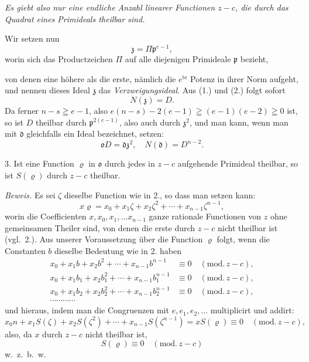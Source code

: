 \documentclass{article}
\begin{document}
\emph{Es giebt also nur eine endliche Anzahl linearer Functionen $z-c$, die durch das Quadrat eines Primideals theilbar sind.}

Wir setzen nun
\[ \mathfrak{z} = \Pi\mathfrak{p}^{e-1}, \tag{2.} \]
worin sich das Productzeichen $\Pi$ auf alle diejenigen Primideale $\mathfrak{p}$ bezieht,

von denen eine höhere als die erste, nämlich die $e^{\text{te}}$ Potenz in ihrer Norm aufgeht, und nennen dieses Ideal $\mathfrak{z}$ das \emph{Verzweigungsideal}. Aus (1.) und (2.) folgt sofort
\[ N(\mathfrak{z}) = D. \tag{3.} \]
Da ferner $n-s \geqq e-1$, also $e(n-s) - 2(e-1) \geqq (e-1)(e-2) \geqq 0$ ist, so ist $D$ theilbar durch $\mathfrak{p}^{2(e-1)}$, also auch durch $\mathfrak{z}^{2}$, und man kann, wenn man mit $\mathfrak{d}$ gleichfalls ein Ideal bezeichnet, setzen:
\[ \mathfrak{o}D = \mathfrak{d}\mathfrak{z}^{2}, \quad N(\mathfrak{d}) = D^{n-2}. \tag{4.} \]

3. Ist eine Function $\varrho$ in $\mathfrak{o}$ durch jedes in $z-c$ aufgehende Primideal theilbar, so ist $S(\varrho)$ durch $z-c$ theilbar.

\emph{Beweis.} Es sei $\zeta$ dieselbe Function wie in 2., so dass man setzen kann:
\[ x\varrho = x_{0} + x_{1}\zeta + x_{2}\zeta^{2} + \cdots + x_{n-1}\zeta^{n-1}, \]
worin die Coefficienten $x, x_{0}, x_{1}, \ldots x_{n-1}$ ganze rationale Functionen von $z$ ohne gemeinsamen Theiler sind, von denen die erste durch $z-c$ nicht theilbar ist (vgl.\ 2.). Aus unserer Voraussetzung über die Function $\varrho$ folgt, wenn die Constanten $b$ dieselbe Bedeutung wie in 2. haben
\[ \begin{aligned} x_{0} + x_{1}b + x_{2}b^{2} + \cdots + x_{n-1}b^{n-1} &\equiv 0 \quad (\text{mod.}\,z-c), \\ x_{0} + x_{1}b_{1} + x_{2}b_{1}^{2} + \cdots + x_{n-1}b_{1}^{n-1} &\equiv 0 \quad (\text{mod.}\,z-c), \\ x_{0} + x_{1}b_{2} + x_{2}b_{2}^{2} + \cdots + x_{n-1}b_{2}^{n-1} &\equiv 0 \quad (\text{mod.}\,z-c), \\ \cdots\cdots\cdots\cdots& \end{aligned} \]
und hieraus, indem man die Congruenzen mit $e, e_{1}, e_{2}, \ldots$ multiplicirt und addirt:
\[ x_{0}n + x_{1}S(\zeta) + x_{2}S(\zeta^{2}) + \cdots + x_{n-1}S(\zeta^{n-1}) = xS(\varrho) \equiv 0 \quad (\text{mod.}\,z-c), \]
also, da $x$ durch $z-c$ nicht theilbar ist,
\[ S(\varrho) \equiv 0 \quad (\text{mod.}\,z-c) \]
w.\ z.\ b.\ w.
\end{document}
